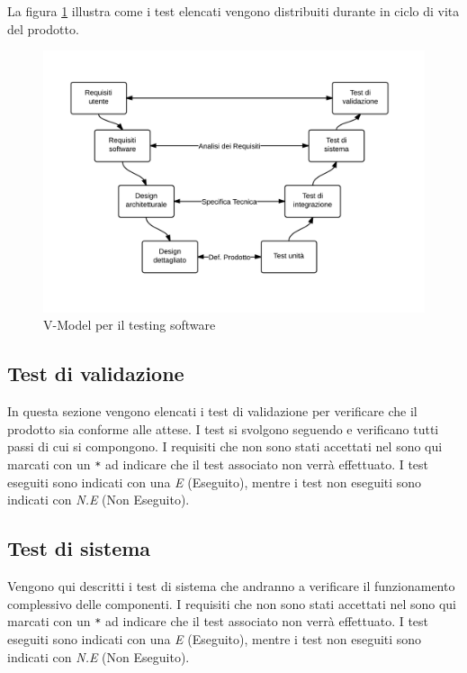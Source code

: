 	La figura \ref{fig:V-Model} illustra come i test elencati vengono distribuiti durante in ciclo di vita del prodotto.

	\begin{figure}[H]
	\centering \includegraphics[width=1\textwidth]{V-Model.png}
	\caption{V-Model per il testing software}
	\label{fig:V-Model}
	\end{figure}

	
	\subsection{Test di validazione}
	In questa sezione vengono elencati i test di validazione per verificare che il prodotto sia conforme alle attese. I test si svolgono seguendo e verificano tutti passi di cui si compongono. I requisiti che non sono stati accettati nel \AnalisiDeiRequisiti{} sono qui marcati con un \texttt{*} ad indicare che il test associato non verrà effettuato. I test eseguiti sono indicati con una \emph{E} (Eseguito), mentre i test non eseguiti sono indicati con \emph{N.E} (Non Eseguito).
	
	


	\subsection{Test di sistema}
	Vengono qui descritti i test di sistema che andranno a verificare il funzionamento complessivo delle componenti. I requisiti che non sono stati accettati nel \AnalisiDeiRequisiti{} sono qui marcati con un \texttt{*} ad indicare che il test associato non verrà effettuato. I test eseguiti sono indicati con una \emph{E} (Eseguito), mentre i test non eseguiti sono indicati con \emph{N.E} (Non Eseguito).
	

